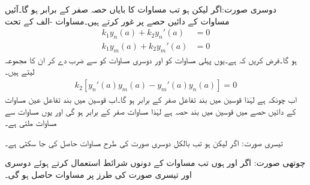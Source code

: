 دوسری صورت:اگر  لیکن  ہو تب مساوات  کا بایاں حصہ صفر کے برابر ہو گا۔آئیں مساوات  کے دائیں حصے پر غور کرتے ہیں۔مساوات -الف کے تحت
\begin{align*}
k_1y_n(a)+k_2y_n'(a)&=0\\
k_1y_m(a)+k_2y_m'(a)&=0
\end{align*}
ہو گا۔فرض کریں کہ  ہے۔یوں پہلی مساوات کو  اور دوسری مساوات کو  سے ضرب دے کر ان کا مجموعہ لیتے ہیں۔
\begin{align*}
k_2[y_n'(a)y_m(a)-y_m'(a)y_n(a)]=0
\end{align*} 
اب چونکہ  ہے لہٰذا قوسین میں بند تفاعل صفر کے برابر ہو گا۔اب قوسین میں بند تفاعل عین مساوات  کے دائیں حصے میں قوسین میں بند حصہ ہے لہٰذا مساوات  صفر کے برابر ہو گی اور یوں مساوات  سے  مساوات  ملتی ہے۔

تیسری صورت: اگر  لیکن  ہو تب بالکل دوسری صورت کی طرح مساوات  حاصل کی جا سکتی ہے۔

چوتھی صورت: اگر  اور  ہوں تب مساوات  کے دونوں شرائط استعمال کرتے ہوئے  دوسری اور تیسری صورت کی طرز پر  مساوات  حاصل ہو گی۔

